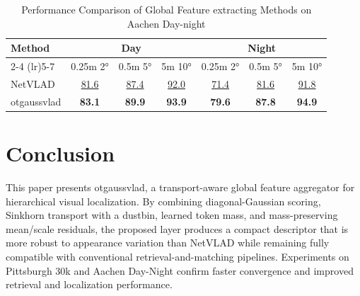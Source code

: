\documentclass[journal]{IEEEtran}
\begin{document}
\begin{table}[htbp]
	\centering
	\caption{Performance Comparison of Global Feature extracting Methods on Aachen Day-night}
	\label{tab:globalfeatures}
	\setlength{\tabcolsep}{2.5pt}
	\begin{tabular}{lccc ccc}
		\hline
		\multirow{3}{*}{\centering Method} & 
		\multicolumn{3}{c}{\multirow{1.5}{*}{Day}} & 
		\multicolumn{3}{c}{\multirow{1.5}{*}{Night}} \\
		\cmidrule(lr){2-4} \cmidrule(lr){5-7}
		& 0.25m 2° & 0.5m 5° & 5m 10° & 0.25m 2° & 0.5m 5° & 5m 10°\\
		
		\hline
		
		NetVLAD \cite{ref7} & \underline{81.6} & \underline{87.4} & \underline{92.0} & \underline{71.4} & \underline{81.6} & \underline{91.8} \\
		otgaussvlad &  \textbf{83.1} &  \textbf{89.9} &  \textbf{93.9} &  \textbf{79.6} &  \textbf{87.8} &  \textbf{94.9} \\
		
		
		\hline
	\end{tabular}
\end{table}


\section{Conclusion}
This paper presents otgaussvlad, a transport-aware global feature aggregator for hierarchical visual localization. By combining diagonal-Gaussian scoring, Sinkhorn transport with a dustbin, learned token mass, and mass-preserving mean/scale residuals, the proposed layer produces a compact descriptor that is more robust to appearance variation than NetVLAD while remaining fully compatible with conventional retrieval-and-matching pipelines. Experiments on Pittsburgh 30k and Aachen Day-Night confirm faster convergence and improved retrieval and localization performance.


%
%	

	




	


\end{document}
